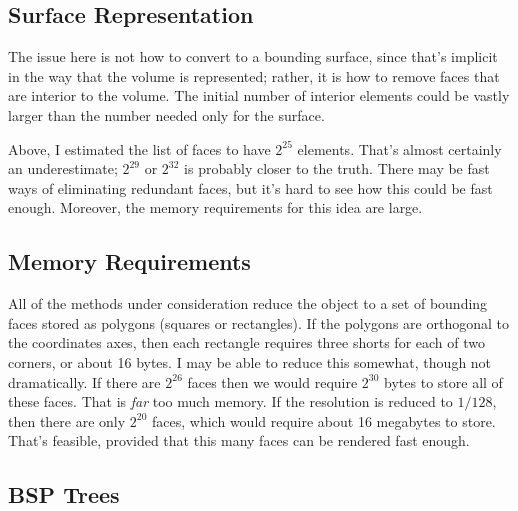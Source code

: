 \documentclass[titlepage,oneside,10pt]{article}
\begin{document}
\subsection{Surface Representation}

The issue here is not how to convert to a bounding surface, since
that's implicit in the way that the volume is represented; rather, it
is how to remove faces that are interior to the volume. The initial number of
interior elements could be vastly larger than the number needed only
for the surface. 

Above, I estimated the list of faces to have $2^{25}$ elements. That's
almost certainly an underestimate; $2^{29}$ or $2^{32}$ is probably
closer to the truth. There may be fast ways of eliminating redundant
faces, but it's hard to see how this could be fast enough. Moreover,
the memory requirements for this idea are large.

\subsection{Memory Requirements}

All of the methods under consideration reduce the object to a set of
bounding faces stored as polygons (squares or rectangles). If the
polygons are orthogonal to the coordinates axes, then each rectangle
requires three shorts for each of two corners, or about 16 bytes. I
may be able to reduce this somewhat, though not dramatically. If there
are $2^{26}$ faces then we would require $2^{30}$ bytes to store all
of these faces. That is \emph{far} too much memory. If the resolution
is reduced to $1/128$, then there are only $2^{20}$ faces, which would
require about 16 megabytes to store. That's feasible, provided that
this many faces can be rendered fast enough.

\subsection{BSP Trees}
\end{document}
